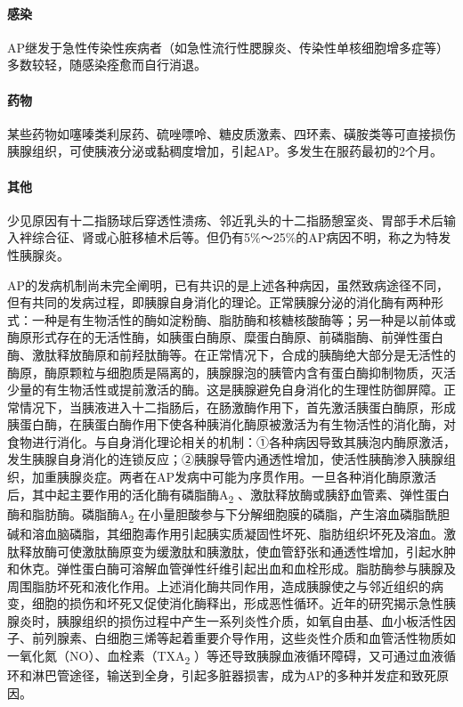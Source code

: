 \paragraph{感染}

AP继发于急性传染性疾病者（如急性流行性腮腺炎、传染性单核细胞增多症等）多数较轻，随感染痊愈而自行消退。

\paragraph{药物}

某些药物如噻嗪类利尿药、硫唑嘌呤、糖皮质激素、四环素、磺胺类等可直接损伤胰腺组织，可使胰液分泌或黏稠度增加，引起AP。多发生在服药最初的2个月。

\paragraph{其他}

少见原因有十二指肠球后穿透性溃疡、邻近乳头的十二指肠憩室炎、胃部手术后输入袢综合征、肾或心脏移植术后等。但仍有5\%～25\%的AP病因不明，称之为特发性胰腺炎。

AP的发病机制尚未完全阐明，已有共识的是上述各种病因，虽然致病途径不同，但有共同的发病过程，即胰腺自身消化的理论。正常胰腺分泌的消化酶有两种形式：一种是有生物活性的酶如淀粉酶、脂肪酶和核糖核酸酶等；另一种是以前体或酶原形式存在的无活性酶，如胰蛋白酶原、糜蛋白酶原、前磷脂酶、前弹性蛋白酶、激肽释放酶原和前羟肽酶等。在正常情况下，合成的胰酶绝大部分是无活性的酶原，酶原颗粒与细胞质是隔离的，胰腺腺泡的胰管内含有蛋白酶抑制物质，灭活少量的有生物活性或提前激活的酶。这是胰腺避免自身消化的生理性防御屏障。正常情况下，当胰液进入十二指肠后，在肠激酶作用下，首先激活胰蛋白酶原，形成胰蛋白酶，在胰蛋白酶作用下使各种胰消化酶原被激活为有生物活性的消化酶，对食物进行消化。与自身消化理论相关的机制：①各种病因导致其胰泡内酶原激活，发生胰腺自身消化的连锁反应；②胰腺导管内通透性增加，使活性胰酶渗入胰腺组织，加重胰腺炎症。两者在AP发病中可能为序贯作用。一旦各种消化酶原激活后，其中起主要作用的活化酶有磷脂酶A\textsubscript{2}
、激肽释放酶或胰舒血管素、弹性蛋白酶和脂肪酶。磷脂酶A\textsubscript{2}
在小量胆酸参与下分解细胞膜的磷脂，产生溶血磷脂酰胆碱和溶血脑磷脂，其细胞毒作用引起胰实质凝固性坏死、脂肪组织坏死及溶血。激肽释放酶可使激肽酶原变为缓激肽和胰激肽，使血管舒张和通透性增加，引起水肿和休克。弹性蛋白酶可溶解血管弹性纤维引起出血和血栓形成。脂肪酶参与胰腺及周围脂肪坏死和液化作用。上述消化酶共同作用，造成胰腺使之与邻近组织的病变，细胞的损伤和坏死又促使消化酶释出，形成恶性循环。近年的研究揭示急性胰腺炎时，胰腺组织的损伤过程中产生一系列炎性介质，如氧自由基、血小板活性因子、前列腺素、白细胞三烯等起着重要介导作用，这些炎性介质和血管活性物质如一氧化氮（NO）、血栓素（TXA\textsubscript{2}
）等还导致胰腺血液循环障碍，又可通过血液循环和淋巴管途径，输送到全身，引起多脏器损害，成为AP的多种并发症和致死原因。

